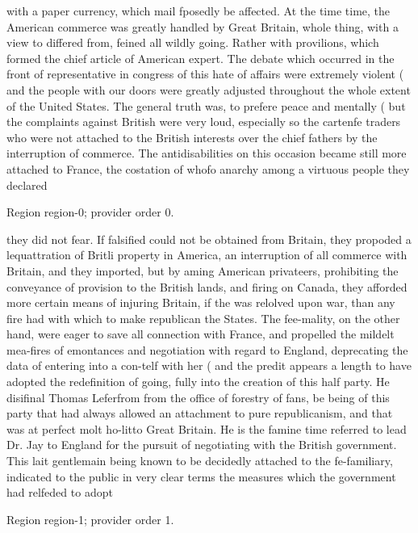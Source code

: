 \documentclass[11pt]{article}
\begin{document}
with a paper currency, which mail fposedly be affected. At the time time, the American commerce was greatly handled by Great Britain, whole thing, with a view to differed from, feined all wildly going. Rather with provilions, which formed the chief article of American expert. The debate which occurred in the front of representative in congress of this hate of affairs were extremely violent ( and the people with our doors were greatly adjusted throughout the whole extent of the United States. The general truth was, to prefere peace and mentally ( but the complaints against British were very loud, especially so the cartenfe traders who were not attached to the British interests over the chief fathers by the interruption of commerce. The antidisabilities on this occasion became still more attached to France, the costation of whofo anarchy among a virtuous people they declared
\par

{\scriptsize\color{gray} Region region-0; provider order 0.\par}
\medskip

they did not fear. If falsified could not be obtained from Britain, they propoded a lequattration of Britli property in America, an interruption of all commerce with Britain, and they imported, but by aming American privateers, prohibiting the conveyance of provision to the British lands, and firing on Canada, they afforded more certain means of injuring Britain, if the was relolved upon war, than any fire had with which to make republican the States. The fee-mality, on the other hand, were eager to save all connection with France, and propelled the mildelt mea-fires of emontances and negotiation with regard to England, deprecating the data of entering into a con-telf with her ( and the predit appears a length to have adopted the redefinition of going, fully into the creation of this half party. He disifinal Thomas Leferfrom from the office of forestry of fans, be being of this party that had always allowed an attachment to pure republicanism, and that was at perfect molt ho-litto Great Britain. He is the famine time referred to lead Dr. Jay to England for the pursuit of negotiating with the British government. This lait gentlemain being known to be decidedly attached to the fe-familiary, indicated to the public in very clear terms the measures which the government had relfeded to adopt
\par

{\scriptsize\color{gray} Region region-1; provider order 1.\par}
\medskip
\end{document}
